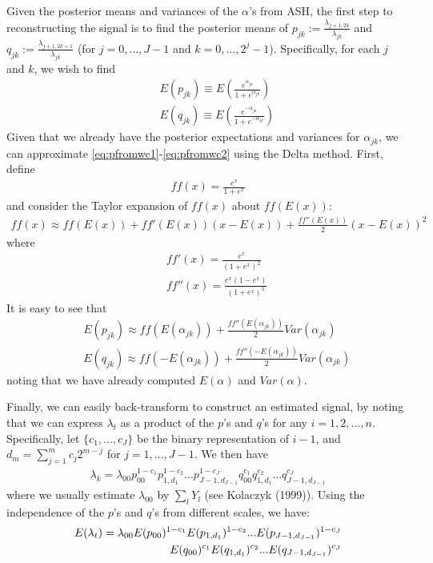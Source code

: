 \documentclass[12pt]{article}
\newcommand{\Ga}{\alpha}
\newcommand{\Gl}{\lambda}    \newcommand{\GL}{\Lambda}
\begin{document}
\begin{appendices}
Given the posterior means and variances of the $\Ga$'s from ASH, the first step to reconstructing the signal is to find the posterior means of $p_{jk}:=\frac{\Gl_{j+1,2k}}{\Gl_{jk}}$ and $q_{jk}:=\frac{\Gl_{j+1,2k+1}}{\Gl_{jk}}$ (for $j=0,...,J-1$ and $k=0,...,2^j-1$). Specifically, for each $j$ and $k$, we wish to find
\begin{eqnarray}\label{eq:pfromwc1}
&&E(p_{jk})\equiv E\left(\frac{e^{\Ga_{jk}}}{1+e^{\Ga_{jk}}}\right)\\
\label{eq:pfromwc2}&&E(q_{jk})\equiv E\left(\frac{e^{-\Ga_{jk}}}{1+e^{-\Ga_{jk}}}\right)\end{eqnarray}
Given that we already have the posterior expectations and variances for $\Ga_{jk}$, we can approximate \eqref{eq:pfromwc1}-\eqref{eq:pfromwc2} using the Delta method. First, define
\begin{eqnarray}\label{eq:ff}ff(x)=\frac{e^x}{1+e^x}\end{eqnarray}
and consider the Taylor expansion of $ff(x)$ about $ff(E(x))$:
\begin{eqnarray}\label{eq:delta}ff(x)\approx ff(E(x))+ff'(E(x))(x-E(x))+\frac{ff''(E(x))}{2}(x-E(x))^2\end{eqnarray}
where
\begin{eqnarray}
\label{eq:fderiv}&&ff'(x)=\frac{e^x}{(1+e^x)^2}\\
\label{eq:sderiv}&&ff''(x)=\frac{e^x(1-e^{x})}{(1+e^x)^3}
\end{eqnarray}
It is easy to see that
\begin{eqnarray}
&&E(p_{jk})\approx ff(E(\Ga_{jk}))+\frac{ff''(E(\Ga_{jk}))}{2}Var(\Ga_{jk})\\
\label{eq:Ep}&&E(q_{jk})\approx ff(-E(\Ga_{jk}))+\frac{ff''(-E(\Ga_{jk}))}{2}Var(\Ga_{jk})
\end{eqnarray}
noting that we have already computed $E(\Ga)$ and $Var(\Ga)$.

Finally, we can easily back-transform to construct an estimated signal, by noting that we can express $\Gl_t$ as a product of the $p$'s and $q$'s for any $i=1,2,...,n$. Specifically, let $\{c_1,...,c_J\}$ be the binary representation of $i-1$, and $d_m=\sum_{j=1}^m c_j2^{m-j}$ for $j=1,...,J-1$. We then have
\begin{eqnarray}\label{eq:product}\Gl_k=\Gl_{00}p_{00}^{1-c_1}p_{1,d_1}^{1-c_2}...p_{J-1,d_{J-1}}^{1-c_J}q_{00}^{c_1}q_{1,d_1}^{c_2}...q_{J-1,d_{J-1}}^{c_J}\end{eqnarray}
where we usually estimate $\Gl_{00}$ by $\sum_l Y_l$ (see Kolaczyk (1999)). Using the independence of the $p$'s and $q$'s from different scales, we have:
\begin{eqnarray}\label{eq:Eproduct}E(\Gl_t)=\Gl_{00}E(p_{00})^{1-c_1}E(p_{1,d_1})^{1-c_2}...E(p_{J-1,d_{J-1}})^{1-c_J}\notag\\
E(q_{00})^{c_1}E(q_{1,d_1})^{c_2}...E(q_{J-1,d_{J-1}})^{c_J}\end{eqnarray}


\end{appendices}
\end{document}
